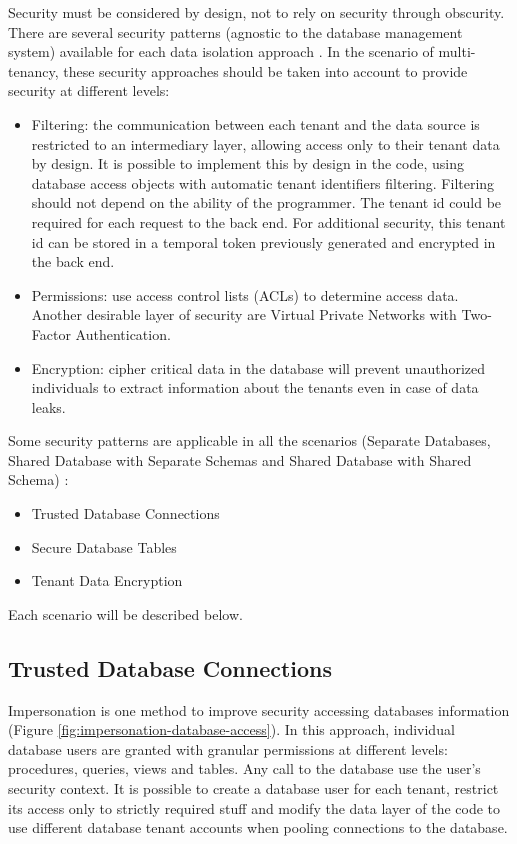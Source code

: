 \documentclass[12pt,english]{article} %
\begin{document}
Security must be considered by design, not to rely on security through obscurity.
There are several security patterns (agnostic to the database management system) available for each data isolation approach \cite{multi-tenant-data-architecture}.
In the scenario of multi-tenancy, these security approaches should be taken into account to provide security at different levels:
\begin{itemize}
    \item Filtering: the communication between each tenant and the data source is restricted to an intermediary layer, allowing access only to their tenant data by design.
    It is possible to implement this by design in the code, using database access objects with automatic tenant identifiers filtering.
    Filtering should not depend on the ability of the programmer.
    The tenant id could be required for each request to the back end.
    For additional security, this tenant id can be stored in a temporal token previously generated and encrypted in the back end.
    \item Permissions: use access control lists (ACLs) to determine access data.
    Another desirable layer of security are Virtual Private Networks with Two-Factor Authentication.
    \item Encryption: cipher critical data in the database will prevent unauthorized individuals to extract information about the tenants even in case of data leaks.
\end{itemize}

Some security patterns are applicable in all the scenarios (Separate Databases, Shared Database with Separate Schemas and Shared Database with Shared Schema) \cite{multi-tenant-data-architecture}:
\begin{itemize}
    \item Trusted Database Connections
    \item Secure Database Tables
    \item Tenant Data Encryption
\end{itemize}

Each scenario will be described below.

\subsection{Trusted Database Connections}
Impersonation is one method to improve security accessing databases information (Figure \ref{fig:impersonation-database-access}).
In this approach, individual database users are granted with granular permissions at different levels: procedures, queries, views and tables.
Any call to the database use the user's security context.
It is possible to create a database user for each tenant, restrict its access only to strictly required stuff and modify the data layer of the code to use different database tenant accounts when pooling connections to the database.
\end{document}
